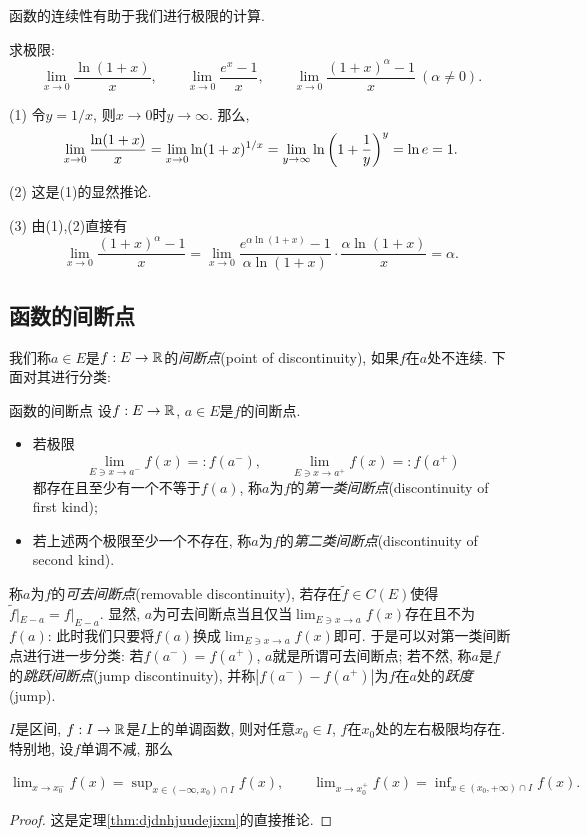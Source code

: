函数的连续性有助于我们进行极限的计算. 

\begin{example}
	求极限: $$\lim_{x\to 0} \frac{\ln (1+x)}{x}, \qquad \lim_{x\to 0} \frac{e^x-1}{x},\qquad \lim_{x\to 0} \frac{(1+x)^{\alpha}-1}{x}~(\alpha \neq 0). $$
\end{example}
\begin{solution}
	(1) 令$y=1/x$, 则$x \to 0$时$y \to \infty$. 那么, $$\lim_{x\to 0} \frac{\ln (1+x)}{x} = \lim_{x\to 0} \ln (1+x)^{1/x} = \lim_{y\to \infty} \ln \left( 1+\frac{1}{y} \right)^y = \ln e = 1.$$
	
	(2) 这是(1)的显然推论. 
	
	(3) 由(1),(2)直接有$$\lim_{x\to 0} \frac{(1+x)^{\alpha}-1}{x} = \lim_{x\to 0} \frac{e^{\alpha \ln (1+x)}-1}{\alpha \ln (1+x)} \cdot \frac{\alpha \ln (1+x)}{x} = \alpha .$$
\end{solution}


\subsection{函数的间断点}

我们称$a \in E$是$f: E \to \mathbb{R}$的\textit{间断点}(point of discontinuity), 如果$f$在$a$处不连续. 下面对其进行分类: 

\begin{definition}{函数的间断点}
	设$f: E \to \mathbb{R}$, $a \in E$是$f$的间断点. 
	\begin{itemize}
		\item 若极限$$\lim_{E \ni x \to a^-}f(x)=:f(a^-), \qquad \lim_{E \ni x \to a^+}f(x)=:f(a^+)$$都存在且至少有一个不等于$f(a)$, 称$a$为$f$的\textit{第一类间断点}(discontinuity of first kind); 
		\item 若上述两个极限至少一个不存在, 称$a$为$f$的\textit{第二类间断点}(discontinuity of second kind). 
	\end{itemize}
\end{definition}

称$a$为$f$的\textit{可去间断点}(removable discontinuity), 若存在$\tilde{f} \in C(E)$使得$\tilde{f} |_{E-a} = f |_{E-a}$. 显然, $a$为可去间断点当且仅当$\lim_{E \ni x \to a}f(x)$存在且不为$f(a)$: 此时我们只要将$f(a)$换成$\lim_{E \ni x \to a}f(x)$即可. 于是可以对第一类间断点进行进一步分类: 若$f(a^-) = f(a^+)$, $a$就是所谓可去间断点; 若不然, 称$a$是$f$的\textit{跳跃间断点}(jump discontinuity), 并称$|f(a^-) - f(a^+)|$为$f$在$a$处的\textit{跃度}(jump). 

\begin{lemma}{}\label{lem:djdnhjuuzoyzjixm}
	$I$是区间, $f:I \to \mathbb{R}$是$I$上的单调函数, 则对任意$x_0 \in I$, $f$在$x_0$处的左右极限均存在. 特别地, 设$f$单调不减, 那么
	\begin{center}
		$\displaystyle \lim_{x \to x_0^-} f(x) = \sup_{x \in (-\infty,x_0) \cap I} f(x),\qquad \lim_{x \to x_0^+} f(x) = \inf_{x \in (x_0,+\infty) \cap I} f(x).$
	\end{center}
\end{lemma}
\begin{proof}
	这是定理\ref{thm:djdnhjuudejixm}的直接推论. 
\end{proof}

